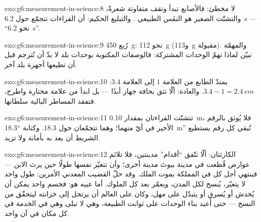 \begin{solution}{exo:g6:measurement-in-science:8}
لا مخطئ: فالأصابع تبدأ وتقف متفاوتة شعرةً، والتشتّت الصغير هو
النفَس الطبيعي . والتبليغ الحكيم: أن القراءات تتجمّع حول
\qty{6.2}{s} --- ``نحو \qty{6.2}{s}''.
\end{solution}

\begin{solution}{exo:g6:measurement-in-science:9}
رُبع \qty{450}{g}: نحو \qty{112}{g} (و\qty{113}{g} مقبولة).
والمهمّة تبيّن لماذا تهمّ الوحدات المشتركة: فالوصفات المكتوبة
بوحدات بلد لا بدّ أن تُترجم قبل أن تطيعها أجهزة بلد آخر.
\end{solution}

\begin{solution}{exo:g6:measurement-in-science:10}
يمتدّ الطابع من العلامة $1$ إلى العلامة $3.4$: $3.4 - 1 =
\qty{2.4}{cm}$. والعادة: ألّا تثق بحافة جهاز أبدًا --- بل ابدأ
من علامة مختارة واطرح، فتفقد المساطر البالية سلطانها.
\end{solution}

\begin{solution}{exo:g6:measurement-in-science:11}
تتشتّت القراءتان بمقدار \qty{0.10}{m}، فلا يُوثق بالرقم الأخير
في أيّ منهما؛ وهما تتجمّعان حول $18.3$. وكتابة ``\qty{18.3}{m}''
تُبقي كل رقم يستطيع الشريط أن يعد به بأمانة ولا تزيد.
\end{solution}

\begin{solution}{exo:g6:measurement-in-science:12}
الكارثتان: ألّا تتّفق ``أقدام'' مدينتين، فلا تلائم عوارض قُطعت
في مدينة بيوتَ مدينة أخرى؛ وأن تتغيّر  نفسها طولًا حين
يرث الابن --- فينتهي أجل كل  في المملكة بموت الملك. وقد حلّ
القضيب المعدني الأمرين: طول واحد لا يتغيّر، يُنسخ لكل المدن،
ويعمّر بعد كل الملوك. أما عيبه هو: فجسم واحد يمكن أن يُخدش أو
يُسرق أو يتبدّل على مهل، وكان على العالم أن يرتحل إلى خزانته
ليتحقّق من النسخ --- حتى أُعيد بناء الوحدات على ثوابت الطبيعة،
وهي لا تبلى وهي في الخدمة في كل مكان في آن واحد.
\end{solution}

